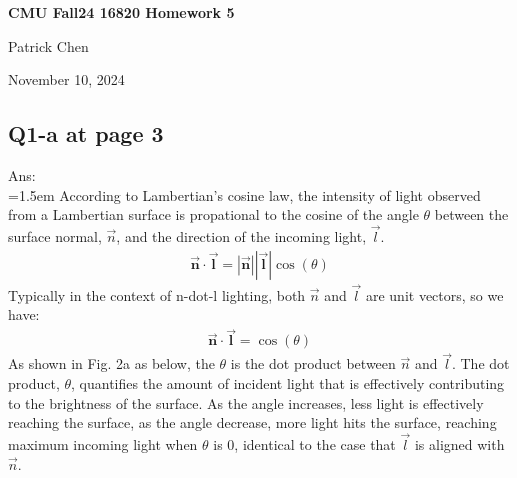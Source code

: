 \documentclass{article}
\begin{document}
	\begin{titlepage}
    	\vspace*{\fill} %
    	\begin{center}
        	{\huge \textbf{CMU Fall24 16820 Homework 5} \par}
       		\vspace{0.5cm}
        		{\large Patrick Chen \par}
        		\vspace{0.5cm}
        		{\large November 10, 2024 \par}
    	\end{center}
    	\vspace*{\fill} %
	\end{titlepage}
	
	\newpage
	\subsection*{Q1-a at page 3}
	Ans:\\
	\hangindent=1.5em \hspace{1.5em}According to Lambertian's cosine law, the intensity of light observed from a Lambertian surface is propational to the cosine of the angle $\theta$ between the surface normal, $\vec{n}$, and the direction of the incoming light, $\vec{l}$.
	\begin{align}
		\mathbf{\overrightarrow{n}} \cdot \mathbf{\overrightarrow{l}} = |\mathbf{\overrightarrow{n}}| |\mathbf{\overrightarrow{l}}| \cos(\theta) 
	\end{align}
	Typically in the context of n-dot-l lighting, both $\vec{n}$ and $\vec{l}$ are unit vectors, so we have:
	\begin{align}
	\mathbf{\overrightarrow{n}} \cdot \mathbf{\overrightarrow{l}} = \cos(\theta) 
	\end{align}
	As shown in Fig. 2a as below, the $\theta$ is the dot product between $\vec{n}$ and $\vec{l}$. The dot product, $\theta$, quantifies the amount of incident light that is effectively contributing to the brightness of the surface. As the angle increases, less light is effectively reaching the surface, as the angle decrease, more light hits the surface, reaching maximum incoming light when $\theta$ is 0, identical to the case that $\vec{l}$ is aligned with $\vec{n}$.
	
\end{document}

